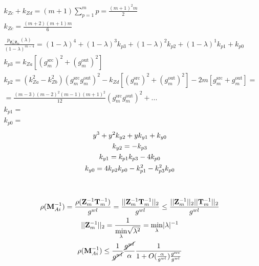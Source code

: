 \documentclass[journal,onecolumn]{IEEEtran}
\begin{document}
\begin{gather*}
        k_{Zc} + k_{Zd} = (m + 1)\sum^{m}_{p=1} p = \frac{(m + 1)^2m}{2} \\
        k_{Zc} = \frac{(m + 2)(m + 1)m}{6} \\
        \\
        \frac{p_{\mathbf{Z}^\top_{m}\mathbf{Z}^{}_{m}}(\lambda)}{(1 - \lambda)^{m - 4}} = (1 - \lambda)^{4} + (1 - \lambda)^{3}k_{p3} + (1 - \lambda)^{2}k_{p2} + (1 - \lambda)^{1}k_{p1} + k_{p0} \\  %
        k_{p3} = k_{Za} \left[ (g^\text{src}_{m})^2 + (g^\text{out}_{m})^2 \right] \\
        k_{p2} = \left( k^2_{Za} - k^2_{Zb} \right)(g^\text{src}_{m}g^\text{out}_{m})^2 - k_{Zd} \left[ (g^\text{src}_{m})^2 + (g^\text{out}_{m})^2 \right] - 2m \left[ g^\text{src}_{m} + g^\text{out}_{m} \right] = \\ = \frac{\left(m - 3\right) \left(m - 2\right)^{2} \left(m - 1\right) \left(m + 1\right)^{2}}{12}(g^\text{src}_{m}g^\text{out}_{m})^2 + ... \\
        k_{p1} =  \\
        k_{p0} =  
    \end{gather*}
    \begin{gather*}
        y^3 + y^2k_{y2} + yk_{y1} + k_{y0} \\
        k_{y2} = -k_{p3} \\
        k_{y1} = k_{p1} k_{p3} - 4 k_{p0} \\
        k_{y0} = 4 k_{p2}k_{p0} - k^2_{p1} - k^2_{p3} k_{p0} \\
        \\ \\
        \rho(\mathbf{M}^{-1}_{Ai}) = \frac{\rho(\mathbf{Z}^{-1}_{m}\mathbf{T}^{-1}_{m})}{g^{wl}} = \frac{||\mathbf{Z}^{-1}_{m}\mathbf{T}^{-1}_{m}||_2}{g^{wl}} \le \frac{||\mathbf{Z}^{-1}_{m}||_2||\mathbf{T}^{-1}_{m}||_2}{g^{wl}} \\
        ||\mathbf{Z}^{-1}_{m}||_2 = \frac{1}{\underset{\lambda}{\min} \sqrt{\lambda^2}} = \underset{\lambda}{\min}|\lambda|^{-1}  \\
        \rho(\mathbf{M}^{-1}_{Ai}) \le \frac{1}{\cancel{g^{wl}}} \frac{\cancel{g^{wl}}}{\alpha} \frac{1}{1 + O(\frac{\alpha}{g^{wl}})\frac{g^\text{src}}{g^{wl}}}
    \end{gather*}
\end{document}
